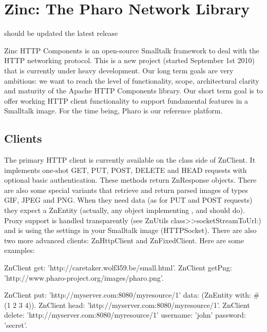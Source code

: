 \documentclass[a4paper,10pt,twoside]{book}
\begin{document}
	\sloppy
\fi
\chapter{Zinc: The Pharo Network Library}



should be updated the latest release



Zinc HTTP Components is an open-source Smalltalk framework to deal with the HTTP networking protocol. This is a new project (started September 1st 2010) that is currently under heavy development. Our long term goals are very ambitious: we want to reach the level of functionality, scope, architectural clarity and maturity of the Apache HTTP Components library. Our short term goal is to offer working HTTP client functionality to support fundamental features in a Smalltalk image. For the time being, Pharo is our reference platform.




\section{Clients}

The primary HTTP client is currently available on the class side of ZnClient. It implements one-shot GET, PUT, POST, DELETE and HEAD requests with optional basic authentication. These methods return ZnResponse objects. There are also some special variants that retrieve and return parsed images of types GIF, JPEG and PNG. When they need data (as for PUT and POST requests) they expect a ZnEntity (actually, any object implementing ,  and  should do). Proxy support is handled transparently (see ZnUtils class>>socketStreamToUrl:) and is using the settings in your Smalltalk image (HTTPSocket). There are also two more advanced clients: ZnHttpClient and ZnFixedClient. Here are some examples:


\begin{code}{}
ZnClient get: 'http://caretaker.wolf359.be/small.html'.
ZnClient getPng: 'http://www.pharo-project.org/images/pharo.png'.

ZnClient put: 'http://myserver.com:8080/myresource/1' data: (ZnEntity with:  #(1 2 3 4)).
ZnClient head: 'http://myserver.com:8080/myresource/1'.
ZnClient delete: 'http://myserver.com:8080/myresource/1' username: 'john' password: 'secret'.
\end{code}
\end{document}
